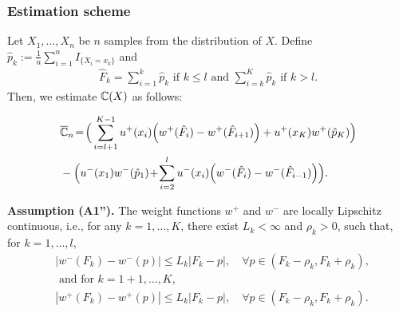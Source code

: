\subsubsection*{Estimation scheme} 
Let $X_1,\ldots,X_n$ be $n$ samples from the distribution of $X$. 
Define $\hat p_k:= \frac{1}{n} \sum_{i=1}^n I_{\{X_i =x_k\}}$ and 
\begin{align}
\label{eq:Fkhat}
 \hat F_k = 
   \sum_{i=1}^k \hat p_k  \text{ if   } k \leq l \text{ and }
   \sum_{i=k}^K \hat p_k  \text{ if  }  k > l.
\end{align}
Then, we estimate $\mathbb{C}(X)$ as follows:
\begin{small}
\begin{align*}
&\overline {\mathbb{C}}_n \!=\! 
\Big(\sum_{i=l+1}^{K-1} u^+(x_i) \Big(w^+(\hat F_i) - w^+(\hat F_{i+1}) \Big)
 + u^+(x_K) w^+(\hat p_K)\Big)\\
&
-\Big(u^-(x_1) w^-(\hat p_1) \!+\!\sum_{i=2}^l u^-(x_i) \Big(w^-(\hat F_i) - w^-( \hat F_{i-1})\Big)\Big) . 
\end{align*}
\end{small}

\noindent\textbf{Assumption (A1'').}  The weight functions $w^+$ and $w^-$ are locally Lipschitz continuous, i.e., for any $k=1,\ldots,K$, there exist  $L_k< \infty$ and $\rho_k>0$, such that, for $k=1,\ldots,l$,
\begin{align*}
&| w^-(F_k) - w^-(p) | \leq L_k |F_k-p|, \quad\forall p \in (F_k-\rho_k,F_k+\rho_k),\\
&\text{ and for } k=1+1,\ldots,K,\\
&| w^+(F_k) - w^+(p) | \leq L_k |F_k-p|, \quad \forall p \in (F_k-\rho_k,F_k+\rho_k). 
\end{align*}


